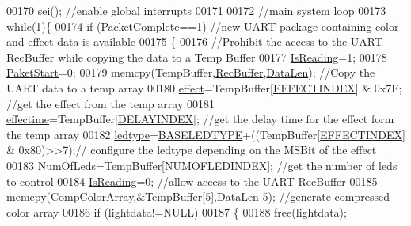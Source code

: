 \begin{DoxyCode}
{00170     sei();                                  \textcolor{comment}{//enable global interrupts}
00171 
00172     \textcolor{comment}{//main system loop}
00173     \textcolor{keywordflow}{while}(1)\{
00174         \textcolor{keywordflow}{if} (\hyperlink{globals_8h_a1b09d1a5bcf4c8ab435bb3c9e36def59}{PacketComplete}==1)    \textcolor{comment}{//new UART package containing color and effect data is
       available}
00175         \{
00176             \textcolor{comment}{//Prohibit the access to the UART RecBuffer while copying the data to a Temp Buffer}
00177             \hyperlink{globals_8h_a922ad5baed647eca43ad1a979e162ebd}{IsReading}=1;       
00178             \hyperlink{globals_8h_aaa3bddd2273257ac5ec259197b62e984}{PaketStart}=0;
00179             memcpy(TempBuffer,\hyperlink{globals_8h_a5d735865707e6694a8173d629e0b4d5c}{RecBuffer},\hyperlink{globals_8h_aaa611e00c18e950be43a4cd5ce0ceeb1}{DataLen});   \textcolor{comment}{//Copy the UART data to a temp array    }
00180             \hyperlink{globals_8h_a053b8e1f039c19251b90d60317db8aed}{effect}=TempBuffer[\hyperlink{ws2811lichterkette_8c_a8d4e4cf47dd6136ace963623e1a8e27c}{EFFECTINDEX}] & 0x7F; \textcolor{comment}{//get the effect from the temp array}
00181             \hyperlink{globals_8h_ac2445d316b2972d381edeac44bb6a226}{effectime}=TempBuffer[\hyperlink{ws2811lichterkette_8c_a9ff437877d0878dd16eacf103a1e1c40}{DELAYINDEX}];        \textcolor{comment}{//get the delay time for the effect
       form the temp array}
00182             \hyperlink{globals_8h_a722e1eb38b661d1338ada3cc7a4049a0}{ledtype}=\hyperlink{globals_8h_af07a5ce170c7be13d096843960e7b9da}{BASELEDTYPE}+((TempBuffer[\hyperlink{ws2811lichterkette_8c_a8d4e4cf47dd6136ace963623e1a8e27c}{EFFECTINDEX}] & 0x80)>>7);\textcolor{comment}{//
      configure the ledtype depending on the MSBit of the effect}
00183             \hyperlink{globals_8h_ad5db4045aed262ed4aae2af9d81fab98}{NumOfLeds}=TempBuffer[\hyperlink{ws2811lichterkette_8c_afbc75dc20761a05dda7cbb70b9b322dd}{NUMOFLEDINDEX}];  \textcolor{comment}{//get the number of leds to control}
00184             \hyperlink{globals_8h_a922ad5baed647eca43ad1a979e162ebd}{IsReading}=0;                           \textcolor{comment}{//allow access to the UART RecBuffer}
00185             memcpy(\hyperlink{globals_8h_a159854edb9d0c7283013495d85bdf997}{CompColorArray},&TempBuffer[5],\hyperlink{globals_8h_aaa611e00c18e950be43a4cd5ce0ceeb1}{DataLen}-5);   \textcolor{comment}{//generate compressed
       color array}
00186             \textcolor{keywordflow}{if} (lightdata!=NULL)
00187             \{
00188                 free(lightdata);
}
\end{DoxyCode}
